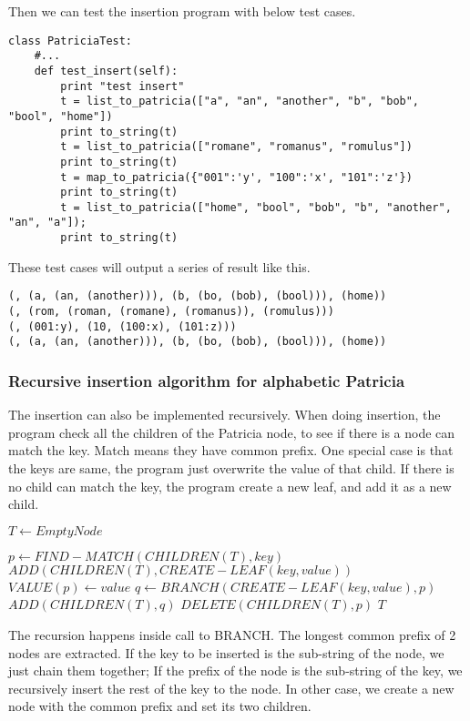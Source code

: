 \documentclass{article}
\begin{document}
Then we can test the insertion program with below test cases.

\begin{lstlisting}
class PatriciaTest:
    #...
    def test_insert(self):
        print "test insert"
        t = list_to_patricia(["a", "an", "another", "b", "bob", "bool", "home"])
        print to_string(t)
        t = list_to_patricia(["romane", "romanus", "romulus"])
        print to_string(t)
        t = map_to_patricia({"001":'y', "100":'x', "101":'z'})
        print to_string(t)
        t = list_to_patricia(["home", "bool", "bob", "b", "another", "an", "a"]);
        print to_string(t)
\end{lstlisting}

These test cases will output a series of result like this.

\begin{verbatim}
(, (a, (an, (another))), (b, (bo, (bob), (bool))), (home))
(, (rom, (roman, (romane), (romanus)), (romulus)))
(, (001:y), (10, (100:x), (101:z)))
(, (a, (an, (another))), (b, (bo, (bob), (bool))), (home))
\end{verbatim}

\subsubsection{Recursive insertion algorithm for alphabetic Patricia}

The insertion can also be implemented recursively. When doing
insertion, the program check all the children of the Patricia node, to
see if there is a node can match the key. Match means they have common
prefix. One special case is that the keys are same, the program just
overwrite the value of that child. If there is no child can match the
key, the program create a new leaf, and add it as a new child.

\begin{algorithmic}[1]
   \State $T \leftarrow EmptyNode$ \EndIf

\State $p \leftarrow FIND-MATCH(CHILDREN(T), key)$
  \State $ADD(CHILDREN(T), CREATE-LEAF(key, value))$
  \State $VALUE(p) \leftarrow value$
\Else
  \State $q \leftarrow BRANCH(CREATE-LEAF(key, value), p)$
  \State $ADD(CHILDREN(T), q)$
  \State $DELETE(CHILDREN(T), p)$
\EndIf
\State \Return $T$
\EndFunction
\end{algorithmic}

The recursion happens inside call to BRANCH. The longest common prefix
of 2 nodes are extracted. If the key to be inserted is the sub-string of
the node, we just chain them together; If the prefix of the node is
the sub-string of the key, we recursively insert the rest of the key
to the node. In other case, we create a new node with the common
prefix and set its two children.
\end{document}
